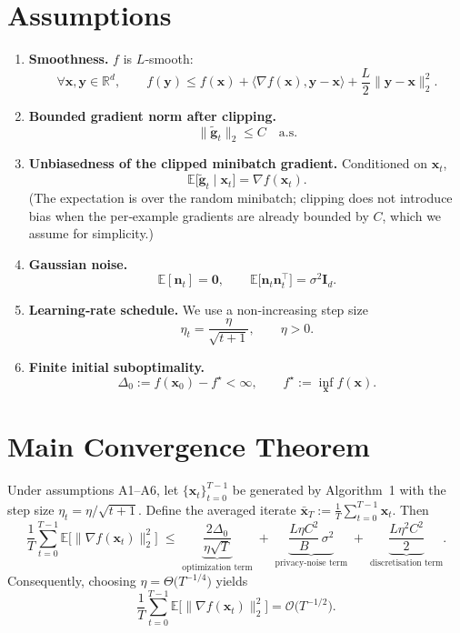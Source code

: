 \documentclass{article}
\begin{document}
\section*{Assumptions}
\begin{enumerate}[label={A\arabic*}:, leftmargin=*, itemsep=0.3em]
\item \textbf{Smoothness.} $f$ is $L$‑smooth:
\[
    \forall\mathbf{x},\mathbf{y}\in\mathbb{R}^d,\qquad
    f(\mathbf{y})\le f(\mathbf{x})+\langle\nabla f(\mathbf{x}),\mathbf{y}-\mathbf{x}\rangle
    +\frac{L}{2}\|\mathbf{y}-\mathbf{x}\|_2^{2}.
\tag{A1}
\]
\item \textbf{Bounded gradient norm after clipping.}
\[
    \|\tilde{\mathbf{g}}_t\|_2\le C \quad\text{a.s.}
\tag{A2}
\]
\item \textbf{Unbiasedness of the clipped minibatch gradient.}
Conditioned on $\mathbf{x}_t$,
\[
    \mathbb{E}\!\bigl[\tilde{\mathbf{g}}_t\mid\mathbf{x}_t\bigr]=\nabla f(\mathbf{x}_t).
\tag{A3}
\]
(The expectation is over the random minibatch; clipping does not introduce bias when the per‑example gradients are already bounded by $C$, which we assume for simplicity.)
\item \textbf{Gaussian noise.}
\[
    \mathbb{E}[\mathbf{n}_t]=\mathbf{0},\qquad
    \mathbb{E}\bigl[\mathbf{n}_t\mathbf{n}_t^{\!\top}\bigr]=\sigma^{2}\mathbf{I}_d.
\tag{A4}
\]
\item \textbf{Learning‑rate schedule.} We use a non‑increasing step size
\[
    \eta_t=\frac{\eta}{\sqrt{t+1}},\qquad \eta>0.
\tag{A5}
\]
\item \textbf{Finite initial suboptimality.}
\[
    \Delta_0:=f(\mathbf{x}_0)-f^\star<\infty,\qquad f^\star:=\inf_{\mathbf{x}} f(\mathbf{x}).
\tag{A6}
\]
\end{enumerate}

\section*{Main Convergence Theorem}
\begin{theorem}\label{thm:main}
Under assumptions A1–A6, let $\{ \mathbf{x}_t\}_{t=0}^{T-1}$ be generated by
Algorithm~1 with the step size $\eta_t=\eta/\sqrt{t+1}$.
Define the averaged iterate $\bar{\mathbf{x}}_T:=\frac{1}{T}\sum_{t=0}^{T-1}\mathbf{x}_t$.
Then
\[
\frac{1}{T}\sum_{t=0}^{T-1}\mathbb{E}\!\bigl[\|\nabla f(\mathbf{x}_t)\|_2^{2}\bigr]
\;\le\;
\underbrace{\frac{2\Delta_0}{\eta\sqrt{T}}}_{\text{optimization term}}
\;+\;
\underbrace{\frac{L\eta C^{2}}{B}\,\sigma^{2}}_{\text{privacy‑noise term}}
\;+\;
\underbrace{\frac{L\eta^{2}C^{2}}{2}}_{\text{discretisation term}} .
\tag{2}
\]
Consequently, choosing $\eta = \Theta\!\bigl(T^{-1/4}\bigr)$ yields
\[
    \frac{1}{T}\sum_{t=0}^{T-1}\mathbb{E}\!\bigl[\|\nabla f(\mathbf{x}_t)\|_2^{2}\bigr]
    =\mathcal{O}\!\bigl(T^{-1/2}\bigr).
\]
\end{theorem}
\end{document}
